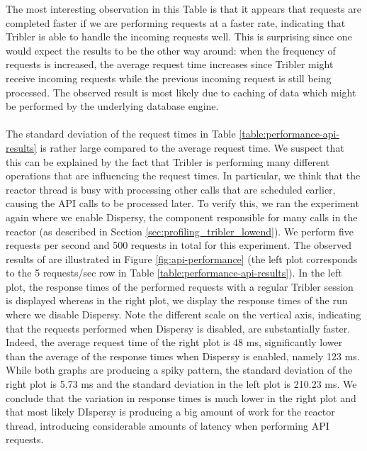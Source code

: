 The most interesting observation in this Table is that it appears that requests are completed faster if we are performing requests at a faster rate, indicating that Tribler is able to handle the incoming requests well. This is surprising since one would expect the results to be the other way around: when the frequency of requests is increased, the average request time increases since Tribler might receive incoming requests while the previous incoming request is still being processed. The observed result is most likely due to caching of data which might be performed by the underlying database engine.\\\\
The standard deviation of the request times in Table \ref{table:performance-api-results} is rather large compared to the average request time. We suspect that this can be explained by the fact that Tribler is performing many different operations that are influencing the request times. In particular, we think that the reactor thread is busy with processing other calls that are scheduled earlier, causing the API calls to be processed later. To verify this, we ran the experiment again where we enable Dispersy, the component responsible for many calls in the reactor (as described in Section \ref{sec:profiling_tribler_lowend}). We perform five requests per second and 500 requests in total for this experiment. The observed results of are illustrated in Figure \ref{fig:api-performance} (the left plot corresponds to the 5 requests/sec row in Table \ref{table:performance-api-results}). In the left plot, the response times of the performed requests with a regular Tribler session is displayed whereas in the right plot, we display the response times of the run where we disable Dispersy. Note the different scale on the vertical axis, indicating that the requests performed when Dispersy is disabled, are substantially faster. Indeed, the average request time of the right plot is 48 ms, significantly lower than the average of the response times when Dispersy is enabled, namely 123 ms. While both graphs are producing a spiky pattern, the standard deviation of the right plot is 5.73 ms and the standard deviation in the left plot is 210.23 ms. We conclude that the variation in response times is much lower in the right plot and that most likely DIspersy is producing a big amount of work for the reactor thread, introducing considerable amounts of latency when performing API requests.\\


